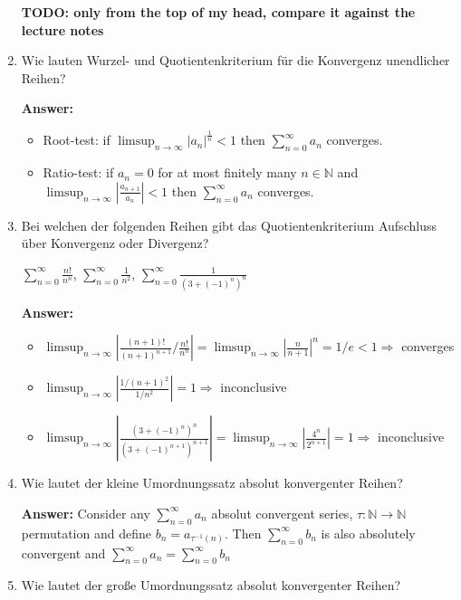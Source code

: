 \documentclass[11pt]{article}
\newcommand{\abs}[1]{\left|#1\right|}
\newcommand{\sumn}[4]{\sum_{#1=#2}^{#3}{#4}}
\begin{document}
\begin{enumerate}
    \textbf{TODO: only from the top of my head, compare it against the lecture notes}
    \item  Wie lauten Wurzel- und Quotientenkriterium für die Konvergenz unendlicher Reihen?
    
    \textbf{Answer:}
    \begin{itemize}
        \item Root-test: if $\limsup_{n\to\infty}\abs{a_n}^{\frac{1}{n}} < 1$ then $\sumn{n}{0}{\infty}{a_n}$ converges.
        \item Ratio-test: if $a_n = 0$ for at most finitely many $n\in\mathbb{N}$ and $\limsup_{n\to\infty}\abs{\frac{a_{n+1}}{a_n}} < 1$ then $\sumn{n}{0}{\infty}{a_n}$ converges.
    \end{itemize}

    \item  Bei welchen der folgenden Reihen gibt das Quotientenkriterium Aufschluss über Konvergenz oder Divergenz?
    \begin{center}
        $\sum_{n=0}^\infty \frac{n!}{n^n}$, $\sum_{n=0}^\infty \frac{1}{n^2}$, $\sum_{n=0}^\infty \frac{1}{(3+(-1)^n)^n}$
    \end{center}

    \textbf{Answer:}
    \begin{itemize}
        \item $\limsup_{n\to\infty}\abs{\frac{(n+1)!}{(n+1)^{n+1}}/\frac{n!}{n^n}} = \limsup_{n\to\infty}\abs{\frac{n}{n+1}}^n = 1/e < 1 \Rightarrow$ converges
        \item $\limsup_{n\to\infty}\abs{\frac{1/(n+1)^2}{1/n^2}} = 1 \Rightarrow$ inconclusive
        \item $\limsup_{n\to\infty}\abs{\frac{(3+(-1)^n)^n}{(3+(-1)^{n+1})^{n+1}}} = \limsup_{n\to\infty}\abs{\frac{4^n}{2^{n+1}}} = 1 \Rightarrow$ inconclusive
    \end{itemize}

    \item  Wie lautet der kleine Umordnungssatz absolut konvergenter Reihen?
    
   
    \textbf{Answer:} Consider any $\sumn{n}{0}{\infty}{a_n}$ absolut convergent series, $\tau\colon \mathbb{N} \to \mathbb{N}$ permutation and define $b_n = a_{\tau^{-1}(n)}$. Then $\sumn{n}{0}{\infty}{b_n}$ is also absolutely convergent and $\sumn{n}{0}{\infty}{a_n} = \sumn{n}{0}{\infty}{b_n}$

    \item  Wie lautet der große Umordnungssatz absolut konvergenter Reihen?
    

\end{enumerate}
\end{document}
